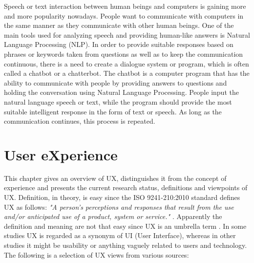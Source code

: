 


Speech or text interaction between human beings and computers is gaining more and more popularity nowadays. People want to communicate with computers in the same manner as they communicate with other human beings. One of the main tools used for analyzing speech and providing human-like answers is Natural Language Processing (NLP). In order to provide suitable responses based on phrases or keywords taken from questions as well as to keep the communication continuous, there is a need to create a dialogue system or program, which is often called a chatbot or a chatterbot. The chatbot is a computer program that has the ability to communicate with people by providing answers to questions and holding the conversation using Natural Language Processing. People input the natural language speech or text, while the program should provide the most suitable intelligent response in the form of text or speech. As long as the communication continues, this process is repeated.

% 
% 
% 
% 
% 
% 
% 


\section{User eXperience}

This chapter gives an overview of UX, distinguishes it from the concept of experience and presents the current research status, definitions and viewpoints of UX. Definition, in theory, is easy since the ISO 9241-210:2010 standard defines UX as follows: \textit{"A person's perceptions and responses that result from the use and/or anticipated use of a product, system or service."} \cite{ergonomics2011}. Apparently the definition and meaning are not that easy since UX is an umbrella term \cite{instone2005}. In some studies UX is regarded as a synonym of UI (User Interface), whereas in other studies it might be usability or anything vaguely related to users and technology. The following is a selection of UX views from various sources:

